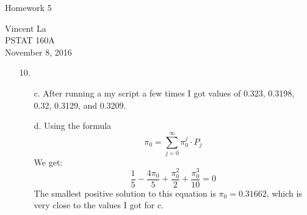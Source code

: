 \documentclass[11pt]{article}
\title{ }
\begin{document}
	\begin{center}	%
		\Large{Homework 5}	%
	\end{center}
	\begin{center}
		Vincent La \\
		PSTAT 160A \\
		November 8, 2016
	\end{center}

\begin{enumerate}

\item[10.]
	\begin{enumerate}
		\item[c.] After running a my script a few times I got values of 0.323, 0.3198, 0.32, 0.3129, and 0.3209.
		\item[d.] Using the formula 
		\[\pi_0 = \sum^\infty_{j=0} \pi^j_0 \cdot P_j \]
		We get:
		\[\frac{1}{5} - \frac{4\pi_0}{5} + \frac{\pi^2_0}{2} + \frac{\pi^3_0}{10} = 0\]
		The smallest positive solution to this equation is $\pi_0 = 0.31662$, which is very close to the values I got for c.
		
	\end{enumerate}
\end{enumerate}
\end{document}
